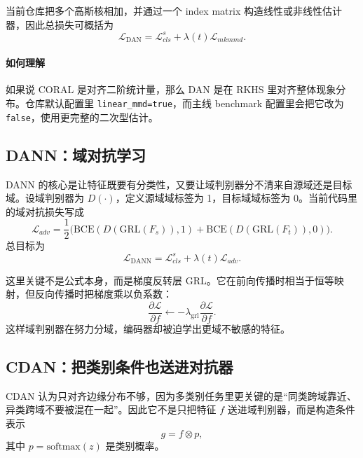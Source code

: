 \documentclass[12pt,a4paper]{ctexart}
\newcommand{\softmax}{\mathrm{softmax}}
\begin{document}
当前仓库把多个高斯核相加，并通过一个 index matrix 构造线性或非线性估计器，因此总损失可概括为
\begin{equation}
\mathcal{L}_{\mathrm{DAN}}
=
\mathcal{L}_{cls}^s+\lambda(t)\mathcal{L}_{mkmmd}.
\end{equation}

\paragraph{如何理解} 如果说 CORAL 是对齐二阶统计量，那么 DAN 是在 RKHS 里对齐整体现象分布。仓库默认配置里 \texttt{linear\_mmd=true}，而主线 benchmark 配置里会把它改为 \texttt{false}，使用更完整的二次型估计。

\subsection{DANN：域对抗学习}

DANN 的核心是让特征既要有分类性，又要让域判别器分不清来自源域还是目标域。设域判别器为 $D(\cdot)$，定义源域域标签为 1，目标域域标签为 0。当前代码里的域对抗损失写成
\begin{equation}
\mathcal{L}_{adv}
=
\frac{1}{2}
\Big(
\mathrm{BCE}(D(\mathrm{GRL}(F_s)),1)
+
\mathrm{BCE}(D(\mathrm{GRL}(F_t)),0)
\Big).
\end{equation}
总目标为
\begin{equation}
\mathcal{L}_{\mathrm{DANN}}
=
\mathcal{L}_{cls}^s+\lambda(t)\mathcal{L}_{adv}.
\end{equation}

这里关键不是公式本身，而是梯度反转层 GRL。它在前向传播时相当于恒等映射，但反向传播时把梯度乘以负系数：
\begin{equation}
\frac{\partial \mathcal{L}}{\partial f}
\leftarrow
-\lambda_{\mathrm{grl}}
\frac{\partial \mathcal{L}}{\partial f}.
\end{equation}
这样域判别器在努力分域，编码器却被迫学出更域不敏感的特征。

\subsection{CDAN：把类别条件也送进对抗器}

CDAN 认为只对齐边缘分布不够，因为多类别任务里更关键的是“同类跨域靠近、异类跨域不要被混在一起”。因此它不是只把特征 $f$ 送进域判别器，而是构造条件表示
\begin{equation}
g = f \otimes p,
\end{equation}
其中 $p=\softmax(z)$ 是类别概率。
\end{document}
